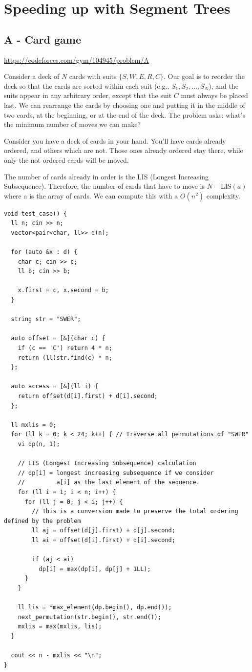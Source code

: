 \section{Speeding up with Segment Trees}

\subsection{A - Card game}
\url{https://codeforces.com/gym/104945/problem/A}

Consider a deck of \( N \) cards with suits \( \{S, W, E, R, C\} \). 
Our goal is to reorder the deck so that the cards are sorted within each suit 
(e.g., \( S_1, S_2, \ldots, S_N \)), and the suits appear in any arbitrary order, 
except that the suit \( C \) must always be placed last.
We can rearrange the cards by choosing one and putting it in the middle of two cards, at the beginning, or at the end of the deck. The problem asks: what's the minimum number of moves we can make?

\begin{obs}
    Consider you have a deck of cards in your hand. You'll have cards already ordered, and others which are not. Those ones already ordered stay there, while only the not ordered cards will be moved.
\end{obs}

The number of cards already in order is the LIS (Longest Increasing Subsequence). Therefore, the number of cards that have to move is $N - \text{LIS}(a)$ where a is the array of cards.
We can compute this with a $O(n^2)$ complexity.

\begin{verbatim}
void test_case() {
  ll n; cin >> n;
  vector<pair<char, ll>> d(n);

  for (auto &x : d) {
    char c; cin >> c;
    ll b; cin >> b;

    x.first = c, x.second = b;
  }

  string str = "SWER";

  auto offset = [&](char c) {
    if (c == 'C') return 4 * n;
    return (ll)str.find(c) * n;
  };

  auto access = [&](ll i) {
    return offset(d[i].first) + d[i].second;
  };

  ll mxlis = 0;
  for (ll k = 0; k < 24; k++) { // Traverse all permutations of "SWER"
    vi dp(n, 1);
    
    // LIS (Longest Increasing Subsequence) calculation
    // dp[i] = longest increasing subsequence if we consider
    //         a[i] as the last element of the sequence.
    for (ll i = 1; i < n; i++) {
      for (ll j = 0; j < i; j++) {
        // This is a conversion made to preserve the total ordering defined by the problem
        ll aj = offset(d[j].first) + d[j].second;
        ll ai = offset(d[i].first) + d[i].second;
      
        if (aj < ai)
          dp[i] = max(dp[i], dp[j] + 1LL);
      }
    }

    ll lis = *max_element(dp.begin(), dp.end());
    next_permutation(str.begin(), str.end());
    mxlis = max(mxlis, lis);
  }

  cout << n - mxlis << "\n";
}
\end{verbatim}

